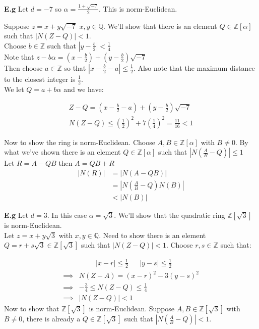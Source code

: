 \documentclass[11pt]{article}
\begin{document}
\newpage
\textbf{E.g} Let $d = -7$ so $\alpha = \frac{1+\sqrt{-7}}{2}$. This is norm-Euclidean.


Suppose $z= x+y \sqrt{-7} $ \hspace{7pt} $x,y \in \mathbb{Q}$. We'll show that there is an element $Q \in \mathbb{Z}[\alpha] $ such that $|N(Z-Q)| <1$.\\[1em]


Choose $b \in \mathbb{Z}$ such that $|y - \frac{b}{2}| < \frac{1}{4}$\\[1em]

Note that $z - b\alpha = (x-\frac{b}{2}) + (y-\frac{b}{2})\sqrt{-7}$\\[1em]

Then choose $a \in \mathbb{Z} $ so that $|x-\frac{b}{2} - a| \leq \frac{1}{2}$. Also note that the maximum distance to the closest integer is $\frac{1}{2}$.\\[1em]

We let $Q= a + b\alpha$ and we have:

\begin{align*}
	Z-Q = (x-\frac{b}{2} - a) + (y-\frac{b}{2}) \sqrt{-7}\\[2em]
	N(Z-Q) \leq (\frac{1}{2})^2 + 7(\frac{1}{4}) ^2 = \frac{11}{16} < 1
\end{align*}

Now to show the ring is norm-Euclidean. Choose $A, B \in \mathbb{Z}[\alpha]$ with $B \neq 0$. By what we've shown there is an element $Q \in \mathbb{Z}[\alpha]$ such that $|N(\frac{A}{B} -Q)| \leq 1$\\[1em]

Let $R = A-QB $ then $A=QB + R$
\begin{align*}
	|N(R)| &= |N(A-QB)|\\
	&= |N(\frac{A}{B} - Q ) N(B) |\\
	&< |N(B)|
\end{align*}

\textbf{E.g} Let $d=3$. In this case $\alpha = \sqrt{3} $. We'll show that the quadratic ring $\mathbb{Z}[\sqrt{3}]$ is norm-Euclidean.\\[1em]

Let $z = x + y \sqrt{3} $ with $x,y \in \mathbb{Q}$. Need to show there is an element $Q = r+s\sqrt{3} \in \mathbb{Z}[\sqrt{3}]$ such that $|N(Z-Q)| < 1$. Choose $r,s \in \mathbb{Z}$ such that:


\begin{align*}
	&|x-r|\leq \frac{1}{2}  && |y-s| \leq \frac{1}{2}
\end{align*}
\begin{align*}
	\implies& N(Z-A) = (x-r)^2 - 3(y-s)^2\\
	\implies& -\frac{3}{4} \leq N(Z-Q) \leq \frac{1}{4}\\
	\implies& |N(Z-Q)|<1
\end{align*}
Now to show that $\mathbb{Z}[\sqrt{3}]$  is norm-Euclidean. Suppose $A, B \in \mathbb{Z}[\sqrt{3}] $ with $B\neq 0$, there is already a $Q \in \mathbb{Z}[\sqrt{3}]$ such that $|N(\frac{A}{B} - Q)|<1$.\\[1em]
\end{document}

